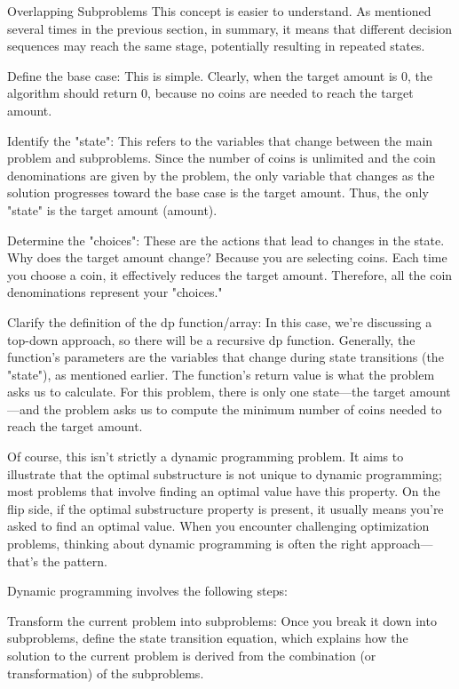 \documentclass[a4paper,11pt,twoside]{book}
\begin{document}
\begin{itemize}
	Overlapping Subproblems
	This concept is easier to understand. As mentioned several times in the previous section, in summary, it means that different decision sequences may reach the same stage, potentially resulting in repeated states.
	
		
	Define the base case: This is simple. Clearly, when the target amount is 0, the algorithm should return 0, because no coins are needed to reach the target amount.
	
	Identify the "state": This refers to the variables that change between the main problem and subproblems. Since the number of coins is unlimited and the coin denominations are given by the problem, the only variable that changes as the solution progresses toward the base case is the target amount. Thus, the only "state" is the target amount (amount).
	
	Determine the "choices": These are the actions that lead to changes in the state. Why does the target amount change? Because you are selecting coins. Each time you choose a coin, it effectively reduces the target amount. Therefore, all the coin denominations represent your "choices."
	
	Clarify the definition of the dp function/array: In this case, we're discussing a top-down approach, so there will be a recursive dp function. Generally, the function's parameters are the variables that change during state transitions (the "state"), as mentioned earlier. The function's return value is what the problem asks us to calculate. For this problem, there is only one state—the target amount—and the problem asks us to compute the minimum number of coins needed to reach the target amount.
	
	Of course, this isn’t strictly a dynamic programming problem. It aims to illustrate that the optimal substructure is not unique to dynamic programming; most problems that involve finding an optimal value have this property. On the flip side, if the optimal substructure property is present, it usually means you’re asked to find an optimal value. When you encounter challenging optimization problems, thinking about dynamic programming is often the right approach—that’s the pattern.
	
	Dynamic programming involves the following steps:
	
	Transform the current problem into subproblems: Once you break it down into subproblems, define the state transition equation, which explains how the solution to the current problem is derived from the combination (or transformation) of the subproblems.
	

\end{itemize}
\end{document}
